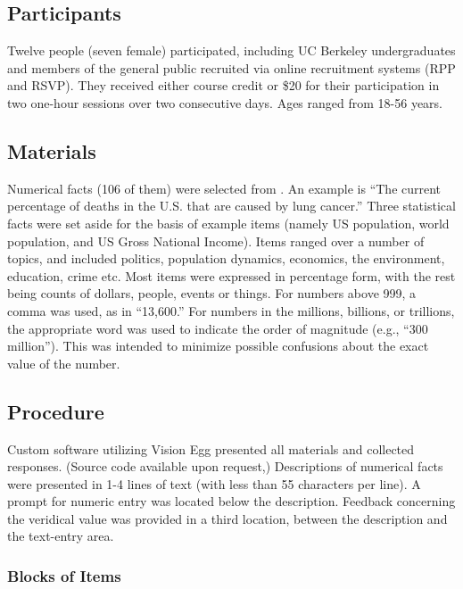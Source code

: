 \subsection{Participants}

Twelve people (seven female) participated, including UC Berkeley undergraduates
and members of the general public recruited via online recruitment systems (RPP
and RSVP). They received either course credit or \$20 for their participation in
two one-hour sessions over two consecutive days. Ages ranged from 18-56 years. 

\subsection{Materials}

Numerical facts (106 of them) were selected from 
. An example is ``The current percentage of deaths in the U.S. that are
caused by lung cancer.'' Three statistical facts were set aside for the basis of
example items (namely US population, world population, and US Gross National
Income). Items ranged over a number of topics, and included politics, population
dynamics, economics, the environment, education, crime etc. Most items were
expressed in percentage form, with the rest being counts of dollars, people,
events or things. For numbers above 999, a comma was used, as in ``13,600.''  For
numbers in the millions, billions, or trillions, the appropriate word was used
to indicate the order of magnitude (e.g., ``300 million'').  This was intended to
minimize possible confusions about the exact value of the number.

\subsection{Procedure}

Custom software utilizing Vision Egg \cite{straw_vision_2008} presented all materials and
collected responses. (Source code available upon request,)  Descriptions of
numerical facts were presented in 1-4 lines of text (with less than 55
characters per line). A prompt for numeric entry was located below the
description. Feedback concerning the veridical value was provided in a third
location, between the description and the text-entry area.

\subsubsection{Blocks of Items}

